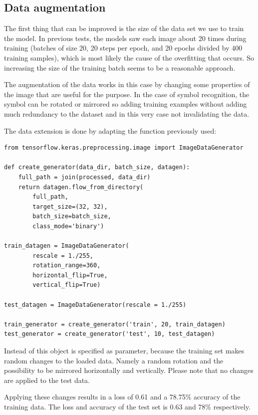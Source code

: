 \subsection{Data augmentation}\label{ch:data_augmentation}

The first thing that can be improved is the size of the data set we use to train the model.
In previous tests, the models saw each image about 20 times during training (batches of size 20, 20 steps per epoch, and 20 epochs divided by 400 training samples), which is most likely the cause of the overfitting that occurs.
So increasing the size of the training batch seems to be a reasonable approach.

The augmentation of the data works in this case by changing some properties of the image that are useful for the purpose.
In the case of symbol recognition, the symbol can be rotated or mirrored so adding training examples without adding much redundancy to the dataset and in this very case not invalidating the data.

The data extension is done by adapting the  function previously used:

\begin{lstlisting}
from tensorflow.keras.preprocessing.image import ImageDataGenerator

def create_generator(data_dir, batch_size, datagen):
    full_path = join(processed, data_dir)
    return datagen.flow_from_directory(
        full_path,
        target_size=(32, 32),
        batch_size=batch_size,
        class_mode='binary')

train_datagen = ImageDataGenerator(
        rescale = 1./255,
        rotation_range=360,
        horizontal_flip=True,
        vertical_flip=True)

test_datagen = ImageDataGenerator(rescale = 1./255)

train_generator = create_generator('train', 20, train_datagen)
test_generator = create_generator('test', 10, test_datagen)
\end{lstlisting}

Instead of  this object is specified as parameter, because the training set makes random changes to the loaded data.
Namely a random rotation and the possibility to be mirrored horizontally and vertically.
Please note that no changes are applied to the test data.

Applying these changes results in a loss of 0.61 and a 78.75\% accuracy of the training data.
The loss and accuracy of the test set is 0.63 and 78\% respectively.

